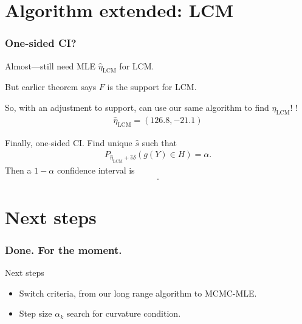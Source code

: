 \documentclass[ 10pt]{beamer}
\newcommand{\etaLCM}{\hat{\eta}_{\textrm{LCM}}}
\begin{document}
\section{Algorithm extended: LCM}
\frame
{
\frametitle{One-sided CI?}  
Almost---still need MLE $\etaLCM$ for LCM.
\vspace{1mm}
\pause

But earlier theorem says $F$ is the support for LCM.
\vspace{1mm}

So, with an adjustment to support, can use our same algorithm to find $\etaLCM$!   \alert{\checkmark}!
\pause
\begin{align*}
	\etaLCM = (126.8, -21.1)
\end{align*}

Finally, one-sided CI.
\pause
Find unique $\hat{s}$ such that
\begin{align*}
		P_{\etaLCM + \hat{s} \delta}\left ( g(Y) \in H\right ) = \alpha.
\end{align*}
Then a $1- \alpha$ confidence interval is
\begin{align*}
[ \etaLCM + \hat{s} \delta, + \infty).
\end{align*}

In this example, we calculate a non-simultaneous 95\% confidence region
\begin{align*}
	[9.145, +\infty) \\
	(-\infty, -1.500].
\end{align*}
}
\section{Next steps}
\frame
{
\frametitle{Done.  For the moment.}


Next steps
\begin{itemize}
	\item Switch criteria, from our long range algorithm to MCMC-MLE.  
	\item Step size $\alpha_k$ search for curvature condition.
\end{itemize}
}
\end{document}
